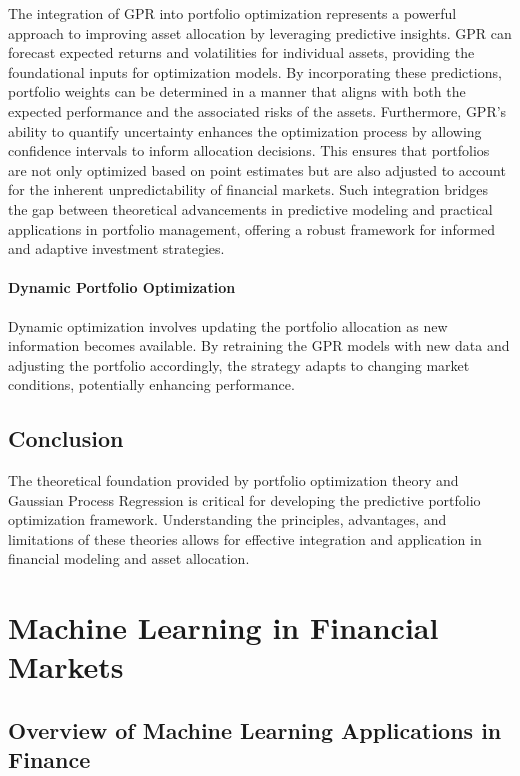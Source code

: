 The integration of GPR into portfolio optimization represents a powerful approach to improving asset allocation by leveraging predictive insights. GPR can forecast expected returns and volatilities for individual assets, providing the foundational inputs for optimization models. By incorporating these predictions, portfolio weights can be determined in a manner that aligns with both the expected performance and the associated risks of the assets. Furthermore, GPR's ability to quantify uncertainty enhances the optimization process by allowing confidence intervals to inform allocation decisions. This ensures that portfolios are not only optimized based on point estimates but are also adjusted to account for the inherent unpredictability of financial markets. Such integration bridges the gap between theoretical advancements in predictive modeling and practical applications in portfolio management, offering a robust framework for informed and adaptive investment strategies.
\paragraph{Dynamic Portfolio Optimization}

Dynamic optimization involves updating the portfolio allocation as new information becomes available. By retraining the GPR models with new data and adjusting the portfolio accordingly, the strategy adapts to changing market conditions, potentially enhancing performance.

\subsection{Conclusion}

The theoretical foundation provided by portfolio optimization theory and Gaussian Process Regression is critical for developing the predictive portfolio optimization framework. Understanding the principles, advantages, and limitations of these theories allows for effective integration and application in financial modeling and asset allocation.


\section{Machine Learning in Financial Markets}

\subsection{Overview of Machine Learning Applications in Finance}

